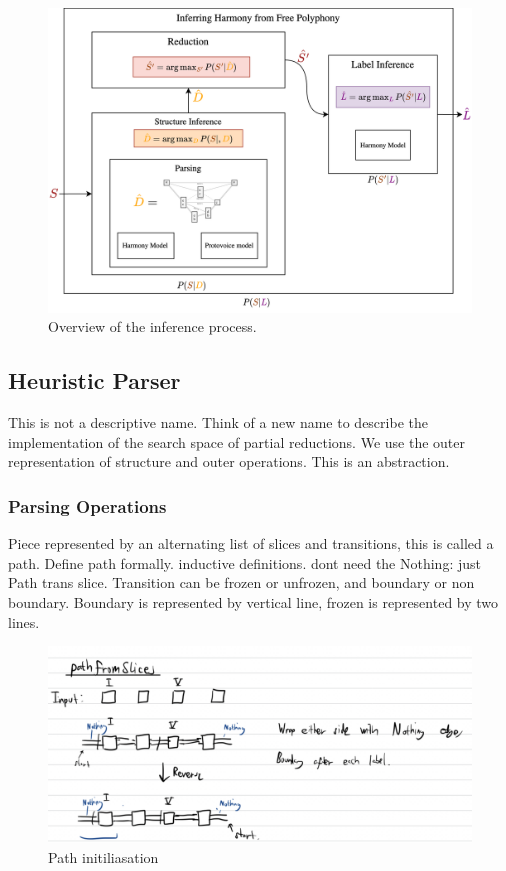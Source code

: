 \documentclass[12pt,a4paper,twoside,openright]{report}
\theoremstyle{definition}
\begin{document}
\begin{figure}
  \centering
  \includegraphics[width=\textwidth]{intro/inferenceOverview}
  \caption{Overview of the inference process.}
  \label{fig:inferenceOverview}
\end{figure}

\subsection{Heuristic Parser}
This is not a descriptive name. Think of a new name to describe the implementation of the search space of partial reductions. We use the outer representation of structure and outer operations. This is an abstraction.

\subsubsection{Parsing Operations}
Piece represented by an alternating list of slices and transitions, this is called a path. Define path formally. inductive definitions. dont need the Nothing: just Path trans slice. Transition can be frozen or unfrozen, and boundary or non boundary. Boundary is represented by vertical line, frozen is represented by two lines.

\begin{figure}[ht]
  \centering
  \includegraphics[width=\textwidth]{pathFromSlices}
  \caption{Path initiliasation}
  \label{fig:pathInit}
\end{figure}
\end{document}
